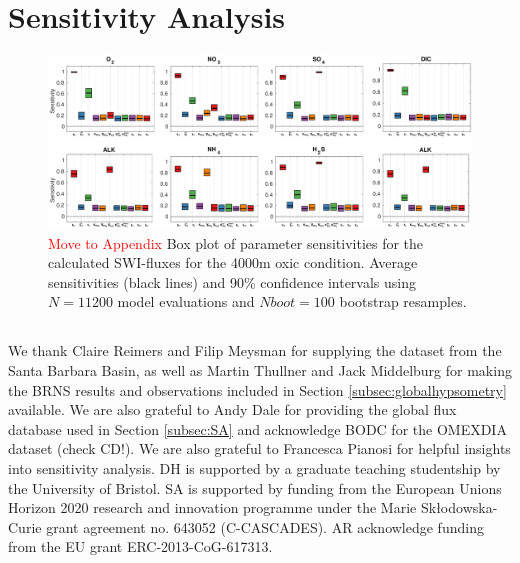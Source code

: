 \documentclass[gmd, manuscript]{copernicus}
\begin{document}
\section{Sensitivity Analysis} 


\begin{figure}[htbp]
\begin{center}
	\includegraphics[width=1.0\textwidth]{figures/SA/0_SIndex_4000m_ALL_combined.pdf}
	\caption{\textcolor{red}{Move to Appendix} Box plot of parameter sensitivities for the calculated SWI-fluxes for the 4000m oxic condition. 
	Average sensitivities (black lines) and 90\% confidence intervals using $N=11200$ model evaluations and $Nboot = 100$ bootstrap resamples.}
	\label{fig:SA_O2+NO3}
	\end{center}
\end{figure}


\subsection{}                               %




\begin{acknowledgements}
We thank Claire Reimers and Filip Meysman for supplying the dataset from the Santa Barbara Basin, as well as Martin Thullner and Jack Middelburg for making the BRNS results and observations 
included in Section \ref{subsec:globalhypsometry} available. We are also grateful to Andy Dale for providing the global flux database used in Section \ref{subsec:SA} and 
acknowledge BODC for the OMEXDIA dataset (check CD!).
We are also grateful to Francesca Pianosi for helpful insights into sensitivity analysis. 
DH is supported by a graduate teaching studentship by the University of Bristol. SA is supported by funding from
the European Unions Horizon 2020 research and innovation programme under the Marie Sk\l{}odowska-Curie grant agreement no.
643052 (C-CASCADES). AR acknowledge funding from the EU grant ERC-2013-CoG-617313.
\end{acknowledgements}
\end{document}
